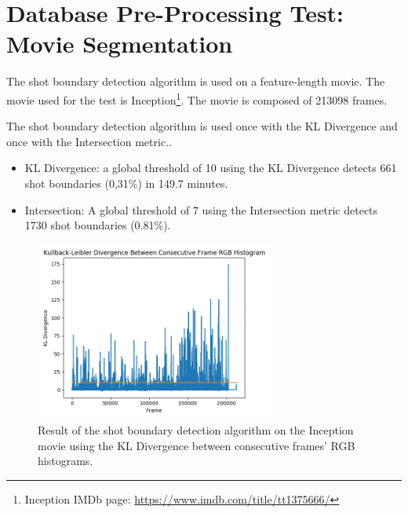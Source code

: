 
\section{Database Pre-Processing Test: Movie Segmentation}

The shot boundary detection algorithm is used on a feature-length movie. The movie used for the test is Inception\footnote{Inception IMDb page: \url{https://www.imdb.com/title/tt1375666/}}. The movie is composed of 213098 frames.

The shot boundary detection algorithm is used once with the KL Divergence and once with the Intersection metric..

\begin{itemize}
    \item KL Divergence: a global threshold of 10 using the KL Divergence detects 661 shot boundaries (0,31\%) in 149.7 minutes.
    \item Intersection: A global threshold of 7 using the Intersection metric detects 1730 shot boundaries (0.81\%).
\end{itemize}

\begin{figure}[h] 
\centerline{\includegraphics[width=0.70\textwidth]{figures/evaluation/inception_KLdiv_threshold10.png}}
\caption{\label{fig:inception_KLdiv_threshold10}Result of the shot boundary detection algorithm on the Inception movie using the KL Divergence between consecutive frames' RGB histograms.}
\end{figure}

